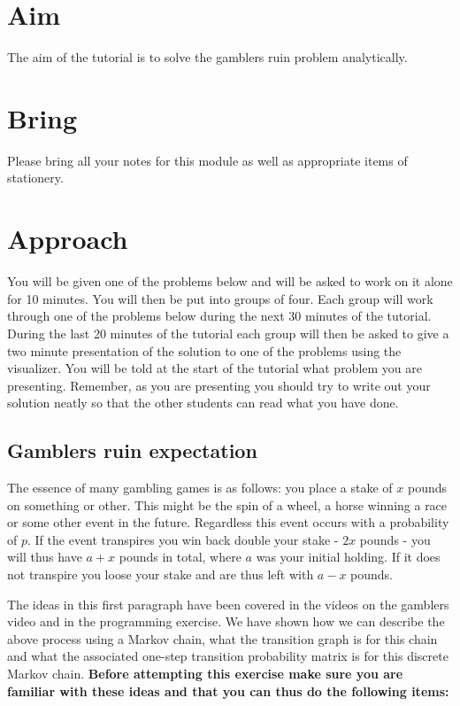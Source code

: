 \documentclass[a4paper]{article}
\begin{document}
\section{Aim}

The aim of the tutorial is to solve the gamblers ruin problem analytically.  

\section{Bring}

Please bring all your notes for this module as well as appropriate items of stationery.

\section{Approach}

You will be given one of the problems below and will be asked to work on it alone for 10 minutes.  You will then be put into groups of four.  Each group will work through one of the problems 
below during the next 30 minutes of the tutorial.  During the last 20 minutes of the tutorial each group will then be asked to give a two minute presentation of the solution to one of the problems 
using the visualizer.  You will be told at the start of the tutorial what problem you are presenting.  Remember, as you are presenting you should try to write out your solution neatly so that the 
other students can read what you have done.

\subsection{Gamblers ruin expectation}

The essence of many gambling games is as follows: you place a stake of $x$ pounds on something or other.  This might be the spin of a wheel, a horse winning a race or some other event in the future.
Regardless this event occurs with a probability of $p$.  If the event transpires you win back double your stake - $2x$ pounds - you will thus have $a + x$ pounds in total, where $a$ was your initial
holding.  If it does not transpire you loose your stake and are thus left with $a - x$ pounds.

The ideas in this first paragraph have been covered in the videos on the gamblers video and in the programming exercise.  We have shown how we can describe the above process using a Markov chain,
what the transition graph is for this chain and what the associated one-step transition probability matrix is for this discrete Markov chain.  {\bf Before attempting this exercise make sure you are
familiar with these ideas and that you can thus do the following items:}
\end{document}
